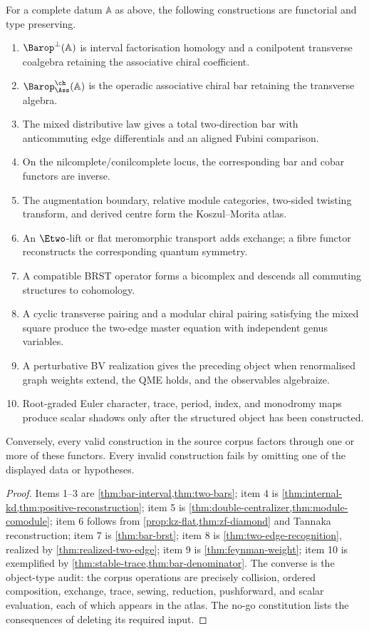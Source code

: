 \begin{theorem}\label{thm:definitive}
For a complete datum \(\mathbb A\) as above, the following constructions are functorial and type preserving.
\begin{enumerate}
\item \(\Barop^\perp(\mathbb A)\) is interval factorisation homology and a conilpotent transverse coalgebra retaining the associative chiral coefficient.
\item \(\Barop^{\ch}_{\Ass}(\mathbb A)\) is the operadic associative chiral bar retaining the transverse algebra.
\item The mixed distributive law gives a total two-direction bar with anticommuting edge differentials and an aligned Fubini comparison.
\item On the nilcomplete/conilcomplete locus, the corresponding bar and cobar functors are inverse.
\item The augmentation boundary, relative module categories, two-sided twisting transform, and derived centre form the Koszul--Morita atlas.
\item An \(\Etwo\)-lift or flat meromorphic transport adds exchange; a fibre functor reconstructs the corresponding quantum symmetry.
\item A compatible BRST operator forms a bicomplex and descends all commuting structures to cohomology.
\item A cyclic transverse pairing and a modular chiral pairing satisfying the mixed square produce the two-edge master equation with independent genus variables.
\item A perturbative BV realization gives the preceding object when renormalised graph weights extend, the QME holds, and the observables algebraize.
\item Root-graded Euler character, trace, period, index, and monodromy maps produce scalar shadows only after the structured object has been constructed.
\end{enumerate}
Conversely, every valid construction in the source corpus factors through one or more of these functors.  Every invalid construction fails by omitting one of the displayed data or hypotheses.
\end{theorem}
\begin{proof}
Items 1--3 are \cref{thm:bar-interval,thm:two-bars}; item 4 is \cref{thm:internal-kd,thm:positive-reconstruction}; item 5 is \cref{thm:double-centralizer,thm:module-comodule}; item 6 follows from \cref{prop:kz-flat,thm:zf-diamond} and Tannaka reconstruction; item 7 is \cref{thm:bar-brst}; item 8 is \cref{thm:two-edge-recognition}, realized by \cref{thm:realized-two-edge}; item 9 is \cref{thm:feynman-weight}; item 10 is exemplified by \cref{thm:stable-trace,thm:bar-denominator}.  The converse is the object-type audit: the corpus operations are precisely collision, ordered composition, exchange, trace, sewing, reduction, pushforward, and scalar evaluation, each of which appears in the atlas.  The no-go constitution lists the consequences of deleting its required input.
\end{proof}


